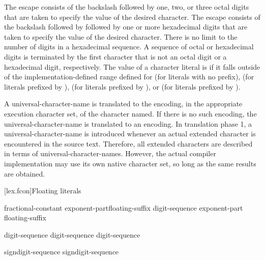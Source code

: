 \pnum
The escape
%
 consists of the backslash followed by one,
two, or three octal digits that are taken to specify the value of the
desired character. The escape
%
consists of the backslash followed by  followed by one or more
hexadecimal digits that are taken to specify the value of the desired
character. There is no limit to the number of digits in a hexadecimal
sequence. A sequence of octal or hexadecimal digits is terminated by the
first character that is not an octal digit or a hexadecimal digit,
respectively.
%
The value of a character literal is  if it falls outside of the implementation-defined range defined for
(for literals with no prefix),  (for literals prefixed
by ),  (for literals prefixed by
), or  (for literals prefixed by ).

\pnum
A universal-character-name is translated to the encoding, in the appropriate
execution character set, of the character named. If there is no such
encoding, the universal-character-name is translated to an
 encoding.
\enternote In translation phase 1, a universal-character-name is introduced whenever an
actual extended
character is encountered in the source text. Therefore, all extended
characters are described in terms of universal-character-names. However,
the actual compiler implementation may use its own native character set,
so long as the same results are obtained. \exitnote

[lex.fcon]{Floating literals}

%
\begin{bnf}
\br
    fractional-constant exponent-part\opt floating-suffix\opt\br
    digit-sequence exponent-part floating-suffix\opt
\end{bnf}

\begin{bnf}
\br
    digit-sequence\opt {} digit-sequence\br
    digit-sequence 
\end{bnf}

\begin{bnf}
\br
     sign\opt digit-sequence\br
     sign\opt digit-sequence
\end{bnf}

